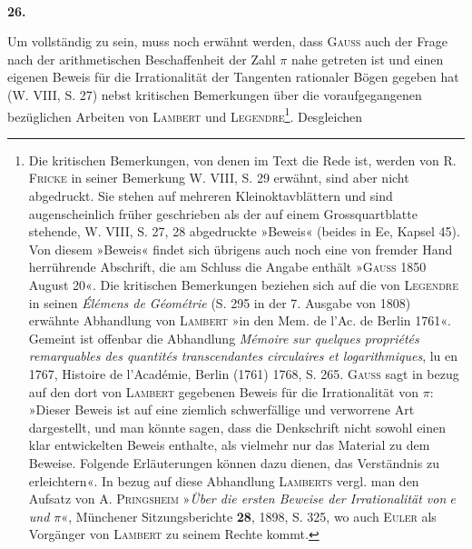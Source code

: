 \begin{center}\\\end{center}
\begin{center}\bfseries 26.\end{center}
\noindent\hspace*{\parindent}Um vollständig zu sein, muss noch erwähnt werden, dass \textsc{Gauss} auch der Frage nach der arithmetischen Beschaffenheit der Zahl \(\pi\) nahe getreten ist und einen eigenen Beweis für die Irrationalität der Tangenten rationaler Bögen gegeben hat (W. VIII, S. 27) nebst kritischen Bemerkungen über die voraufgegangenen bezüglichen Arbeiten von \textsc{Lambert} und \textsc{Legendre}\footnote{Die kritischen Bemerkungen, von denen im Text die Rede ist, werden von R. \textsc{Fricke} in seiner Bemerkung W. VIII, S. 29 erwähnt, sind aber nicht abgedruckt. Sie stehen auf mehreren Kleinoktavblättern und sind augenscheinlich früher geschrieben als der auf einem Grossquartblatte stehende, W. VIII, S. 27, 28 abgedruckte »Beweis« (beides in Ee, Kapsel 45). Von diesem »Beweis« findet sich übrigens auch noch eine von fremder Hand herrührende Abschrift, die am Schluss die Angabe enthält »\textsc{Gauss} 1850 August 20«. Die kritischen Bemerkungen beziehen sich auf die von \textsc{Legendre} in seinen \textit{Élémens de Géométrie} (S. 295 in der 7. Ausgabe von 1808) erwähnte Abhandlung von \textsc{Lambert} »in den Mem. de l’Ac. de Berlin 1761«. Gemeint ist offenbar die Abhandlung \textit{Mémoire sur quelques propriétés remarquables des quantités transcendantes circulaires et logarithmiques}, lu en 1767, Histoire de l’Académie, Berlin (1761) 1768, S. 265. \textsc{Gauss} sagt in bezug auf den dort von \textsc{Lambert} gegebenen Beweis für die Irrationalität von \(\pi\): »Dieser Beweis ist auf eine ziemlich schwerfällige und verworrene Art dargestellt, und man könnte sagen, dass die Denkschrift nicht sowohl einen klar entwickelten Beweis enthalte, als vielmehr nur das Material zu dem Beweise. Folgende Erläuterungen können dazu dienen, das Verständnis zu erleichtern«. In bezug auf diese Abhandlung \textsc{Lamberts} vergl. man den Aufsatz von A. \textsc{Pringsheim} »\textit{Über die ersten Beweise der Irrationalität von \(e\) und \(\pi\)}«, Münchener Sitzungsberichte \textbf{28}, 1898, S. 325, wo auch \textsc{Euler} als Vorgänger von \textsc{Lambert} zu seinem Rechte kommt.}. Desgleichen
\newpage{}
